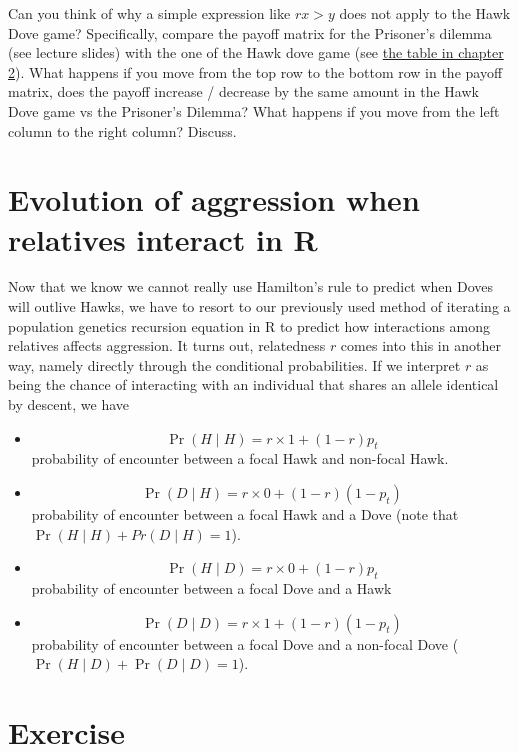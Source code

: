 \documentclass[
]{book}
\providecommand{\tightlist}{%
  \setlength{\itemsep}{0pt}\setlength{\parskip}{0pt}}
\begin{document}
Can you think of why a simple expression like \(r x > y\) does not apply to the Hawk Dove game? Specifically, compare the payoff matrix for the Prisoner's dilemma (see lecture slides) with the one of the Hawk dove game (see \protect\hyperlink{tab:payoffHD}{the table in chapter 2}). What happens if you move from the top row to the bottom row in the payoff matrix, does the payoff increase / decrease by the same amount in the Hawk Dove game vs the Prisoner's Dilemma? What happens if you move from the left column to the right column? Discuss.

\hypertarget{evolution-of-aggression-when-relatives-interact-in-r}{%
\section{Evolution of aggression when relatives interact in R}\label{evolution-of-aggression-when-relatives-interact-in-r}}

Now that we know we cannot really use Hamilton's rule to predict when Doves will outlive Hawks, we have to resort to our previously used method of iterating a population genetics recursion equation in R to predict how interactions among relatives affects aggression. It turns out, relatedness \(r\) comes into this in another way, namely directly through the conditional probabilities. If we interpret \(r\) as being the chance of interacting with an individual that shares an allele identical by descent, we have

\begin{itemize}
\tightlist
\item
  \[ \Pr(H \mid H) = r \times 1 + (1-r ) p_{t} \] probability of encounter between a focal Hawk and non-focal Hawk.
\item
  \[ \Pr(D \mid H) = r \times 0 + (1-r) (1-p_{t}) \] probability of encounter between a focal Hawk and a Dove (note that \(\Pr(H \mid H) + Pr(D \mid H) = 1\)).
\item
  \[ \Pr(H \mid D) = r \times 0 + (1-r) p_{t} \] probability of encounter between a focal Dove and a Hawk
\item
  \[ \Pr(D \mid D) = r \times 1 + (1- r) (1-p_{t} ) \] probability of encounter between a focal Dove and a non-focal Dove (\(\Pr(H \mid D) + \Pr(D \mid D) = 1\)).
\end{itemize}

\hypertarget{exercise-8}{%
\section{Exercise}\label{exercise-8}}
\end{document}
